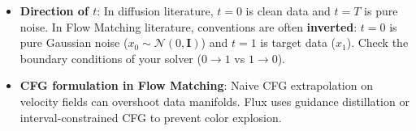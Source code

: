 \begin{trap}
\begin{itemize}[leftmargin=*,itemsep=0.8pt]
\item \textbf{Direction of $t$}: In diffusion literature, $t=0$ is clean data and $t=T$ is pure noise. In Flow Matching literature, conventions are often \textbf{inverted}: $t=0$ is pure Gaussian noise ($x_0 \sim \mathcal{N}(0, \mathbf{I})$) and $t=1$ is target data ($x_1$). Check the boundary conditions of your solver ($0 \to 1$ vs $1 \to 0$).
\item \textbf{CFG formulation in Flow Matching}: Naive CFG extrapolation on velocity fields can overshoot data manifolds. Flux uses guidance distillation or interval-constrained CFG to prevent color explosion.
\end{itemize}
\end{trap}
